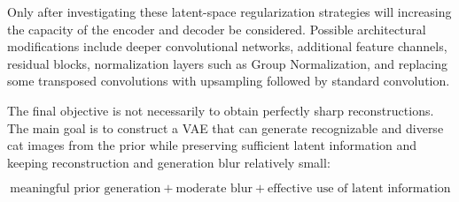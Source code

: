\documentclass[a4paper,11pt]{article}
\begin{document}
Only after investigating these latent-space regularization strategies will increasing the capacity of the encoder and decoder be considered. Possible architectural modifications include deeper convolutional networks, additional feature channels, residual blocks, normalization layers such as Group Normalization, and replacing some transposed convolutions with upsampling followed by standard convolution.

The final objective is not necessarily to obtain perfectly sharp reconstructions. The main goal is to construct a VAE that can generate recognizable and diverse cat images from the prior while preserving sufficient latent information and keeping reconstruction and generation blur relatively small:

\[
\boxed{
\text{meaningful prior generation}
+
\text{moderate blur}
+
\text{effective use of latent information}
}
\]
\end{document}
